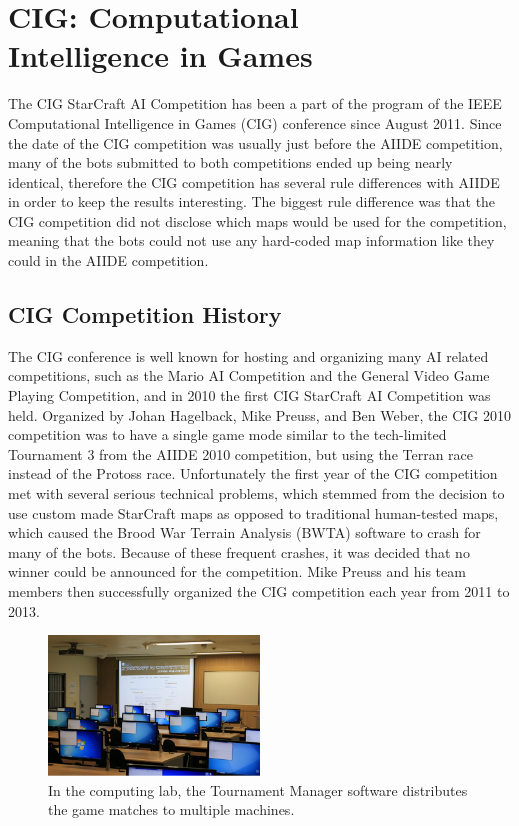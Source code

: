 \section{CIG: Computational\\ Intelligence in Games}\label{subsecCIG}

The CIG StarCraft AI Competition has been a part of the program of the IEEE Computational Intelligence in Games (CIG) conference since August 2011.  Since the date of the CIG competition was usually just before the AIIDE competition, many of the bots submitted to both competitions ended up being nearly identical, therefore the CIG competition has several rule differences with AIIDE in order to keep the results interesting. The biggest rule difference was that the CIG competition did not disclose which maps would be used for the competition, meaning that the bots could not use any hard-coded map information like they could in the AIIDE competition.

\subsection{CIG Competition History}
The CIG conference is well known for hosting and organizing many AI related competitions, such as the Mario AI Competition and the General Video Game Playing Competition, and in 2010 the first CIG StarCraft AI Competition was held. Organized by Johan Hagelback, Mike Preuss, and Ben Weber, the CIG 2010 competition was to have a single game mode similar to the tech-limited Tournament 3 from the AIIDE 2010 competition, but using the Terran race instead of the Protoss race. Unfortunately the first year of the CIG competition met with several serious technical problems, which stemmed from the decision to use custom made StarCraft maps as opposed to traditional human-tested maps, which caused the Brood War Terrain Analysis (BWTA) software to crash for many of the bots. Because of these frequent crashes, it was decided that no winner could be announced for the competition. Mike Preuss and his team members then successfully organized the CIG competition each year from 2011 to 2013.

\begin{figure}[t]
  \centering
  \includegraphics[width=0.5\textwidth]{fig/cig-starcraft-runs.png}
  \caption{In the computing lab, the Tournament Manager software distributes the game matches to multiple machines.}
  \label{figCIGruns}
\end{figure}

